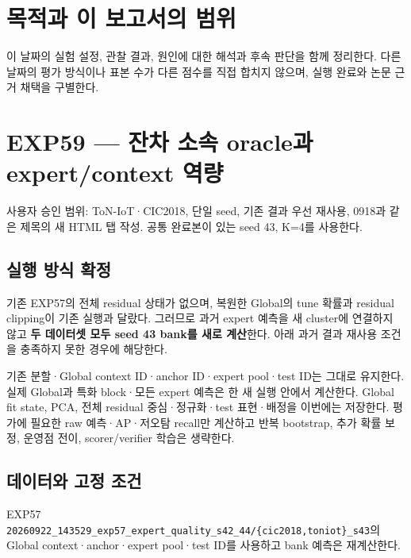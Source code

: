 




\section*{목적과 이 보고서의 범위}

이 날짜의 실험 설정, 관찰 결과, 원인에 대한 해석과 후속 판단을 함께 정리한다. 다른 날짜의 평가 방식이나 표본 수가 다른 점수를 직접 합치지 않으며, 실행 완료와 논문 근거 채택을 구별한다.


\section{EXP59 — 잔차 소속 oracle과 expert/\allowbreak{}context 역량}
사용자 승인 범위: ToN-IoT·CIC2018, 단일 seed, 기존 결과 우선 재사용, 0918과 같은 제목의 새 HTML 탭 작성. 공통 완료본이 있는 seed 43, K=\allowbreak{}4를 사용한다.

\subsection{실행 방식 확정}
기존 EXP57의 전체 residual 상태가 없으며, 복원한 Global의 tune 확률과 residual clipping이 기존 실행과 달랐다. 그러므로 과거 expert 예측을 새 cluster에 연결하지 않고 \textbf{두 데이터셋 모두 seed 43 bank를 새로 계산}한다. 아래 과거 결과 재사용 조건을 충족하지 못한 경우에 해당한다.

기존 분할·Global context ID·anchor ID·expert pool·test ID는 그대로 유지한다. 실제 Global과 특화 block·모든 expert 예측은 한 새 실행 안에서 계산한다. Global fit state, PCA, 전체 residual 중심·정규화·test 표현·배정을 이번에는 저장한다. 평가에 필요한 raw 예측·AP·저오탐 recall만 계산하고 반복 bootstrap, 추가 확률 보정, 운영점 전이, scorer/\allowbreak{}verifier 학습은 생략한다.

\subsection{데이터와 고정 조건}
\par\noindent \textbullet\enspace EXP57 \texttt{20260922\allowbreak{}\_\allowbreak{}\allowbreak{}143529\_\allowbreak{}\allowbreak{}exp57\_\allowbreak{}\allowbreak{}ex\allowbreak{}pert\_\allowbreak{}\allowbreak{}qua\allowbreak{}lity\_\allowbreak{}\allowbreak{}s42\allowbreak{}\_\allowbreak{}\allowbreak{}44/\allowbreak{}\allowbreak{}\{\allowbreak{}cic\allowbreak{}2018,\allowbreak{}ton\allowbreak{}iot\}\allowbreak{}\_\allowbreak{}\allowbreak{}s43\allowbreak{}}의 Global context·anchor·expert pool·test ID를 사용하고 bank 예측은 재계산한다.


